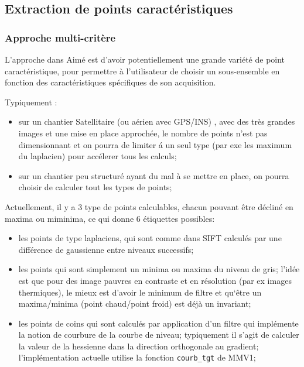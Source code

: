 
\subsection{Extraction de points caract\'eristiques}


\subsubsection{Approche multi-crit\`ere }

L'approche dans Aim\'e est d'avoir potentiellement une grande vari\'et\'e de point caract\'eristique,
pour permettre \`a l'utilisateur de choisir un sous-ensemble en fonction des caract\'eristiques
sp\'ecifiques de son acquisition.

Typiquement :

\begin{itemize}
   \item sur un chantier Satellitaire (ou a\'erien avec GPS/INS) , avec 
         des tr\`es grandes images et une mise en place approch\'ee,
         le nombre de points n'est pas dimensionnant et on pourra de limiter \'a un seul type (par exe
         les maximum du laplacien) pour acc\'elerer tous les calculs;

   \item sur un chantier peu structur\'e ayant du mal \`a se mettre en place, on pourra choisir de
         calculer tout les types de points;
\end{itemize}

Actuellement, il y a $3$ type de points calculables, chacun pouvant être d\'eclin\'e en maxima
ou miminima, ce qui donne $6$ \'etiquettes possibles:

\begin{itemize}
   \item les points de type laplaciens, qui sont comme dans SIFT calcul\'es par  une diff\'erence de
         gaussienne entre niveaux successifs;

   \item les points qui sont simplement un minima ou maxima du niveau de gris; l'id\'ee est que pour des
         image pauvres en contraste et en r\'esolution (par ex images thermiques), le mieux est d'avoir le
         minimum de filtre et qu`\^etre un maxima/minima (point chaud/point froid) est d\'ej\`a un invariant;


   \item les points de coins qui sont calcul\'es par application d'un filtre qui impl\'emente
          la notion de courbure de la courbe de niveau; typiquement il s'agit de calculer la valeur
          de la hessienne dans la direction orthogonale au gradient; l'impl\'ementation actuelle
          utilise la fonction {\tt courb\_tgt} de MMV1;
\end{itemize}


